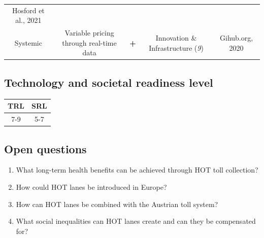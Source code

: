 \documentclass[
]{book}
\providecommand{\tightlist}{%
  \setlength{\itemsep}{0pt}\setlength{\parskip}{0pt}}
\begin{document}
\begin{longtable}[]{@{}ccccc@{}}
\begin{minipage}[t]{0.17\columnwidth}
Hosford et al., 2021\strut
\end{minipage}\tabularnewline
\begin{minipage}[t]{0.17\columnwidth}\centering
Systemic\strut
\end{minipage} & \begin{minipage}[t]{0.16\columnwidth}\centering
Variable pricing through real-time data\strut
\end{minipage} & \begin{minipage}[t]{0.17\columnwidth}\centering
\textbf{+}\strut
\end{minipage} & \begin{minipage}[t]{0.17\columnwidth}\centering
Innovation \& Infrastructure (\emph{9})\strut
\end{minipage} & \begin{minipage}[t]{0.17\columnwidth}\centering
Gihub.org, 2020\strut
\end{minipage}\tabularnewline
\bottomrule
\end{longtable}

\hypertarget{technology-and-societal-readiness-level-3}{%
\subsection*{Technology and societal readiness level}\label{technology-and-societal-readiness-level-3}}

\begin{longtable}[]{@{}cc@{}}
\toprule
TRL & SRL\tabularnewline
\midrule
\endhead
7-9 & 5-7\tabularnewline
\bottomrule
\end{longtable}

\hypertarget{open-questions-3}{%
\subsection*{Open questions}\label{open-questions-3}}

\begin{enumerate}
\def\labelenumi{\arabic{enumi}.}
\tightlist
\item
  What long-term health benefits can be achieved through HOT toll collection?
\item
  How could HOT lanes be introduced in Europe?
\item
  How can HOT lanes be combined with the Austrian toll system?
\item
  What social inequalities can HOT lanes create and can they be compensated for?
\end{enumerate}
\end{document}
